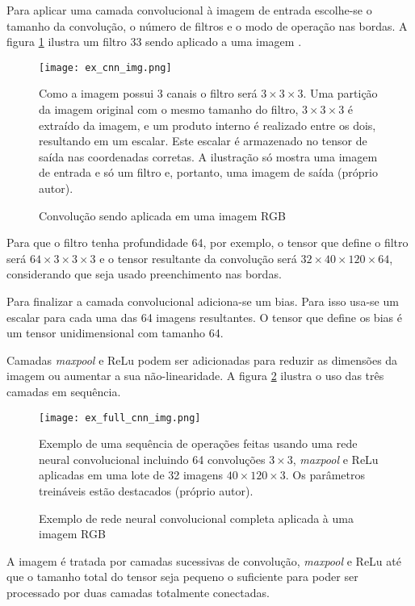 Para aplicar uma camada convolucional à imagem de entrada escolhe-se o tamanho
da convolução, o número de filtros e o modo de operação nas bordas. A figura
\ref{fig:ex_cnn_img} ilustra um filtro 33 sendo aplicado a uma imagem
.

\begin{figure}[!htb]
	\centering
	\texttt{[image: ex\_cnn\_img.png]}
	\caption{Convolução sendo aplicada em uma imagem RGB}
	\label{fig:ex_cnn_img}
	Como a imagem possui 3 canais o filtro será $3 \times 3 \times 3$.
	Uma partição da imagem original com o mesmo tamanho do filtro,
	$3 \times 3 \times 3$ é extraído da imagem, e um
	produto interno é realizado entre os dois, resultando em um escalar. Este
	escalar é armazenado no tensor de saída nas coordenadas corretas. A
	ilustração só mostra uma imagem de entrada e só um filtro e, portanto, uma
	imagem de saída (próprio autor).
\end{figure}

Para que o filtro tenha profundidade 64, por exemplo, o tensor que define o
filtro será $64 \times 3 \times 3 \times 3$ e o tensor resultante da
convolução será $32 \times 40 \times 120 \times 64$,
considerando que seja usado preenchimento nas bordas.

Para finalizar a camada convolucional adiciona-se um bias. Para isso usa-se um
escalar para cada uma das 64 imagens resultantes. O tensor que define os bias é
um tensor unidimensional com tamanho 64.

Camadas \emph{maxpool} e ReLu podem ser adicionadas para reduzir as
dimensões da imagem ou aumentar a sua não-linearidade. A figura
\ref{fig:ex_full_cnn_img} ilustra o uso das três camadas em sequência.

\begin{figure}[!htb]
	\centering
	\texttt{[image: ex\_full\_cnn\_img.png]}
	\caption{Exemplo de rede neural convolucional completa aplicada à uma imagem
	RGB}
	\label{fig:ex_full_cnn_img}
	Exemplo de uma sequência de operações feitas usando uma rede neural
	convolucional incluindo 64 convoluções $3 \times 3$, \emph{maxpool} e
	ReLu aplicadas em uma
	lote de 32 imagens $40 \times 120 \times 3$. Os parâmetros treináveis
	estão destacados (próprio autor).
\end{figure}

A imagem é tratada por camadas sucessivas de convolução, \emph{maxpool} e
ReLu até que
o tamanho total do tensor seja pequeno o suficiente para poder ser processado
por duas camadas totalmente conectadas. 

